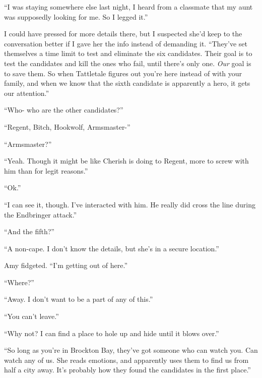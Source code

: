 ``I was staying somewhere else last night, I heard from a classmate that my aunt was supposedly looking for me.  So I legged it.''



I could have pressed for more details there, but I suspected she'd keep to the conversation better if I gave her the info instead of demanding it.  ``They've set themselves a time limit to test and eliminate the six candidates.  Their goal is to test the candidates and kill the ones who fail, until there's only one.  \emph{Our} goal is to save them.  So when Tattletale figures out you're here instead of with your family, and when we know that the sixth candidate is apparently a hero, it gets our attention.''



``Who- who are the other candidates?''



``Regent, Bitch, Hookwolf, Armsmaster-''



``Armsmaster?''



``Yeah.  Though it might be like Cherish is doing to Regent, more to screw with him than for legit reasons.''



``Ok.''



``I can see it, though.  I've interacted with him.  He really did cross the line during the Endbringer attack.''



``And the fifth?''



``A non-cape.  I don't know the details, but she's in a secure location.''



Amy fidgeted.  ``I'm getting out of here.''



``Where?''



``Away.  I don't want to be a part of any of this.''



``You can't leave.''



``Why not?  I can find a place to hole up and hide until it blows over.''



``So long as you're in Brockton Bay, they've got someone who can watch you.  Can watch any of us.  She reads emotions, and apparently uses them to find us from half a city away.  It's probably how they found the candidates in the first place.''



